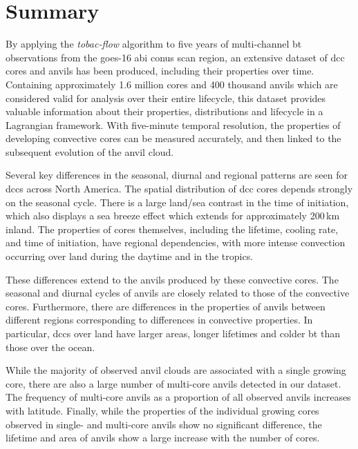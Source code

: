 \section{Summary}  %

By applying the \textit{tobac-flow} algorithm to five years of multi-channel \acrshort{bt} observations from the \acrshort{goes}-16 \acrshort{abi} \acrshort{conus} scan region, an extensive dataset of \acrshort{dcc} cores and anvils has been produced, including their properties over time.
Containing approximately 1.6 million cores and 400 thousand anvils which are considered valid for analysis over their entire lifecycle, this dataset provides valuable information about their properties, distributions and lifecycle in a Lagrangian framework.
With five-minute temporal resolution, the properties of developing convective cores can be measured accurately, and then linked to the subsequent evolution of the anvil cloud.

Several key differences in the seasonal, diurnal and regional patterns are seen for \acrshort{dcc}s across North America.
The spatial distribution of \acrshort{dcc} cores depends strongly on the seasonal cycle.
There is a large land/sea contrast in the time of initiation, which also displays a sea breeze effect which extends for approximately 200\,\unit{km} inland.
The properties of cores themselves, including the lifetime, cooling rate, and time of initiation, have regional dependencies, with more intense convection occurring over land during the daytime and in the tropics.

These differences extend to the anvils produced by these convective cores.
The seasonal and diurnal cycles of anvils are closely related to those of the convective cores.
Furthermore, there are differences in the properties of anvils between different regions corresponding to differences in convective properties.
In particular, \acrshort{dcc}s over land have larger areas, longer lifetimes and colder \acrshort{bt} than those over the ocean.

While the majority of observed anvil clouds are associated with a single growing core, there are also a large number of multi-core anvils detected in our dataset.
The frequency of multi-core anvils as a proportion of all observed anvils increases with latitude.
Finally, while the properties of the individual growing cores observed in single- and multi-core anvils show no significant difference, the lifetime and area of anvils show a large increase with the number of cores.

